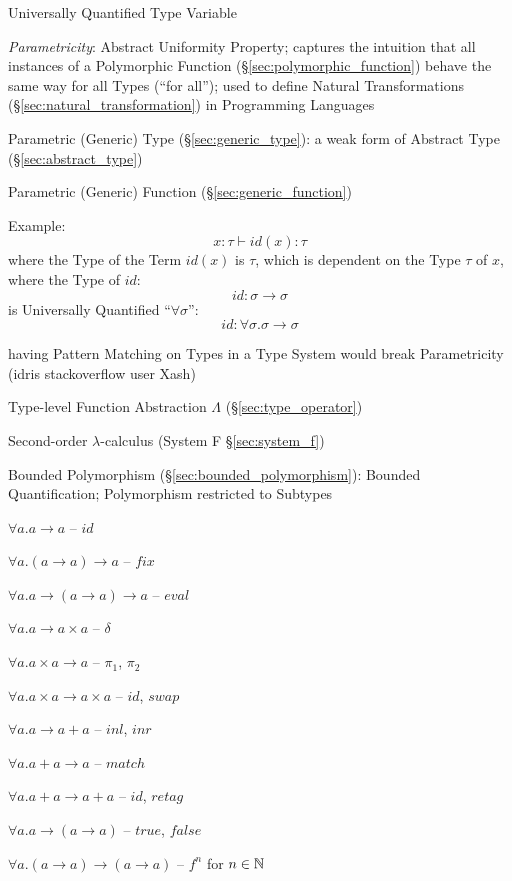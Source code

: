 Universally Quantified Type Variable

\emph{Parametricity}: Abstract Uniformity Property; captures the
intuition that all instances of a Polymorphic Function
(\S\ref{sec:polymorphic_function}) behave the same way for all Types
(``for all''); used to define Natural Transformations
(\S\ref{sec:natural_transformation}) in Programming Languages

Parametric (Generic) Type (\S\ref{sec:generic_type}): a weak form of
Abstract Type (\S\ref{sec:abstract_type})

Parametric (Generic) Function (\S\ref{sec:generic_function})

Example:
\[
  x:\tau \vdash id(x):\tau
\]
where the Type of the Term $id(x)$ is $\tau$, which is dependent on
the Type $\tau$ of $x$, where the Type of $id$:
\[
  id:\sigma \rightarrow \sigma
\]
is Universally Quantified ``$\forall \sigma$'':
\[
  id:\forall \sigma.\sigma \rightarrow \sigma
\]


having Pattern Matching on Types in a Type System would break
Parametricity (idris stackoverflow user Xash) %

Type-level Function Abstraction $\Lambda$ (\S\ref{sec:type_operator})

Second-order $\lambda$-calculus (System F \S\ref{sec:system_f})

Bounded Polymorphism (\S\ref{sec:bounded_polymorphism}): Bounded
Quantification; Polymorphism restricted to Subtypes


\asterism


$\forall a.a \rightarrow a$ -- $id$

$\forall a.(a \rightarrow a) \rightarrow a$ -- $fix$

$\forall a.a \rightarrow (a \rightarrow a) \rightarrow a$ -- $eval$


$\forall a.a \rightarrow a \times a$ -- $\delta$

$\forall a.a \times a \rightarrow a$ -- $\pi_1$, $\pi_2$

$\forall a.a \times a \rightarrow a \times a$ -- $id$, $swap$


$\forall a.a \rightarrow a + a$ -- $inl$, $inr$

$\forall a.a + a \rightarrow a$ -- $match$

$\forall a.a + a \rightarrow a + a$ -- $id$, $retag$


$\forall a.a \rightarrow (a \rightarrow a)$ -- $true$, $false$


$\forall a.(a \rightarrow a) \rightarrow (a \rightarrow a)$ -- $f^n$
for $n \in \mathbb{N}$


